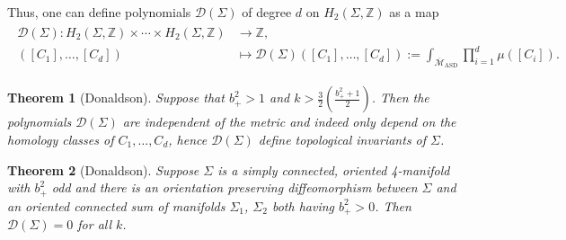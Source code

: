 \documentclass[11pt,colorinlistoftodos]{amsart}
\numberwithin{equation}{subsection}
\theoremstyle{plain}
\newtheorem{thm}{Theorem}[subsection]
\theoremstyle{definition}
\theoremstyle{remark}
\newcommand{\Z}{\mathbb{Z}}
\newcommand{\calD}{\mathcal{D}}
\newcommand{\calM}{\mathcal{M}}
\begin{document}
Thus, one can define polynomials $\calD(\Sigma)$ of degree $d$ on $H_2(\Sigma,\mathbb{Z})$ as a map  
\begin{align}
\label{eq:Donaldson_polynomials}
\begin{split}
\calD(\Sigma)\colon H_2(\Sigma,\Z)\times\dotsm \times H_2(\Sigma,\Z)&\to \Z,\\
([C_1],\ldots,[C_d])&\mapsto\calD(\Sigma)([C_1],\ldots,[C_d]):=\int_{\overline{\calM}_\mathrm{ASD}}\prod_{i=1}^d\mu([C_i]).
\end{split}
\end{align}

\begin{thm}[Donaldson\cite{Donaldson1983}]
Suppose that $b_+^2>1$ and $k>\frac{3}{2}\left(\frac{b_+^2+1}{2}\right)$. Then the polynomials $\calD(\Sigma)$ are independent of the metric and indeed only depend on the homology classes of $C_1,\ldots, C_d$, hence $\calD(\Sigma)$ define topological invariants of $\Sigma$.
\end{thm}
 
\begin{thm}[Donaldson\cite{Donaldson1990}]
Suppose $\Sigma$ is a simply connected, oriented 4-manifold with $b_+^2$ odd and there is an orientation preserving diffeomorphism between $\Sigma$ and an oriented connected sum of manifolds $\Sigma_1$, $\Sigma_2$ both having $b_+^2>0$. Then $\calD(\Sigma)=0$ for all $k$.
\end{thm}
\end{document}

